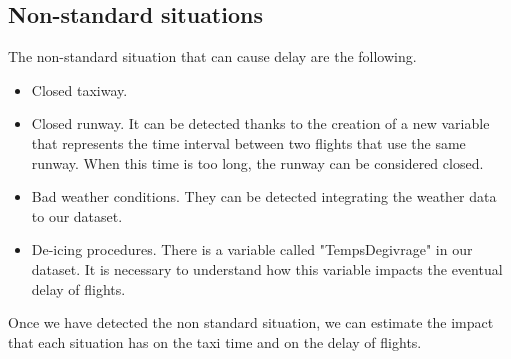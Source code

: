 \documentclass{article}
\begin{document}
\subsection{Non-standard situations}
The non-standard situation that can cause delay are the following.

\begin{itemize}
	\item Closed taxiway.
	\item Closed runway. It can be detected thanks to the creation of a new variable that represents the time interval between two flights that use the same runway. When this time is too long, the runway can be considered closed.
	\item Bad weather conditions. They can be detected integrating the weather data to our dataset.
	\item De-icing procedures. There is a variable called "TempsDegivrage" in our dataset. It is necessary to understand how this variable impacts the eventual delay of flights.
\end{itemize}

Once we have detected the non standard situation, we can estimate the impact that each situation has on the taxi time and on the delay of flights.
\end{document}
